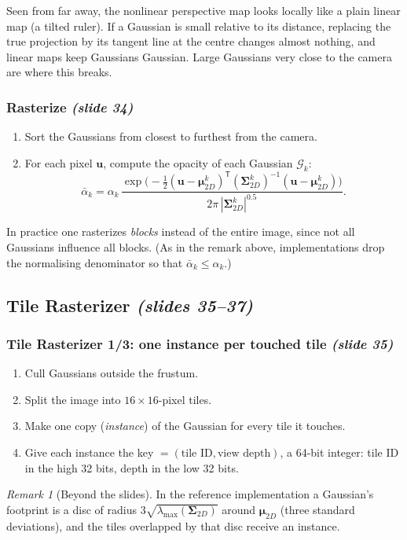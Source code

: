 \documentclass[11pt,a4paper]{article}
\newcommand{\G}{\mathcal{G}}
\newcommand{\T}{^{\mathsf T}}
\newcommand{\abar}{\bar\alpha}
\newcommand{\sr}[1]{\texorpdfstring{\emph{(#1)}}{(#1)}}
\theoremstyle{definition}
\theoremstyle{algstyle}
\theoremstyle{plain}
\theoremstyle{remark}
\newtheorem{remark}[definition]{Remark}
\begin{document}
\begin{intuition}
Seen from far away, the nonlinear perspective map looks locally like a plain linear map (a tilted ruler). If a Gaussian is small relative to its distance, replacing the true projection by its tangent line at the centre changes almost nothing, and linear maps keep Gaussians Gaussian. Large Gaussians very close to the camera are where this breaks.
\end{intuition}

\subsubsection{Rasterize \sr{slide 34}}
\begin{enumerate}[nosep]
\item Sort the Gaussians from closest to furthest from the camera.
\item For each pixel $\bm u$, compute the opacity of each Gaussian $\G_k$:
\[
\abar_k=\alpha_k\,\frac{\exp\!\big(-\tfrac12(\bm u-\bm\mu^k_{2D})\T(\bm\Sigma^k_{2D})^{-1}(\bm u-\bm\mu^k_{2D})\big)}{2\pi\,|\bm\Sigma^k_{2D}|^{0.5}}.
\]
\end{enumerate}
In practice one rasterizes \emph{blocks} instead of the entire image, since not all Gaussians influence all blocks. (As in the remark above, implementations drop the normalising denominator so that $\abar_k\le\alpha_k$.)

\subsection{Tile Rasterizer \sr{slides 35--37}}
\subsubsection{Tile Rasterizer 1/3: one instance per touched tile \sr{slide 35}}
\begin{enumerate}[nosep]
\item Cull Gaussians outside the frustum.
\item Split the image into $16\times16$-pixel tiles.
\item Make one copy (\emph{instance}) of the Gaussian for every tile it touches.
\item Give each instance the key $=(\text{tile ID},\text{view depth})$, a 64-bit integer: tile ID in the high 32 bits, depth in the low 32 bits.
\end{enumerate}

\begin{remark}[Beyond the slides]
In the reference implementation a Gaussian's footprint is a disc of radius $3\sqrt{\lambda_{\max}(\bm\Sigma_{2D})}$ around $\bm\mu_{2D}$ (three standard deviations), and the tiles overlapped by that disc receive an instance.
\end{remark}
\end{document}
